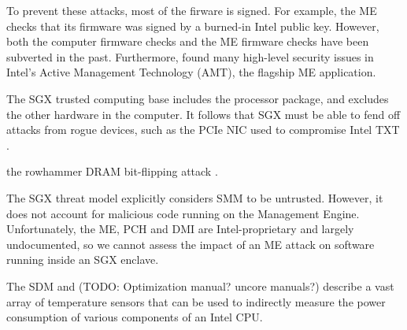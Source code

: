 To prevent these attacks, most of the firware is signed. For example, the ME
checks that its firmware was signed by a burned-in Intel public key. However,
both the computer firmware checks \cite{wojtczuk2010bios, furtak2014bios} and
the ME firmware checks \cite{tereshkin2009amt} have been subverted in the past.
Furthermore, \cite{ververis2010security} found many high-level security issues
in Intel's Active Management Technology (AMT), the flagship ME application.


The SGX trusted computing base includes the processor package, and excludes the
other hardware in the computer. It follows that SGX must be able to fend off
attacks from rogue devices, such as the PCIe NIC used to compromise Intel TXT
\cite{wojtczuk2011txt}.


the rowhammer DRAM bit-flipping attack
\cite{kim2014rowhammer, google2015rowhammer, gruss2015rowhammer}.


The SGX threat model explicitly considers SMM to be untrusted. However, it does
not account for malicious code running on the Management Engine. Unfortunately,
the ME, PCH and DMI are Intel-proprietary and largely undocumented, so we
cannot assess the impact of an ME attack on software running inside an SGX
enclave.

The SDM and (TODO: Optimization manual? uncore manuals?) describe a vast array
of temperature sensors that can be used to indirectly measure the power
consumption of various components of an Intel CPU.

